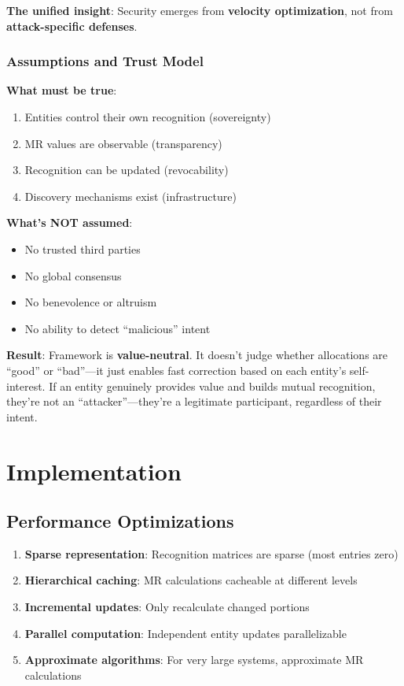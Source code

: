 \documentclass[11pt,a4paper]{article}
\theoremstyle{definition}
\theoremstyle{remark}
\begin{document}
\textbf{The unified insight}: Security emerges from \textbf{velocity optimization}, not from \textbf{attack-specific defenses}.

\subsubsection{Assumptions and Trust Model}

\textbf{What must be true}:
\begin{enumerate}
\item Entities control their own recognition (sovereignty)
\item MR values are observable (transparency)
\item Recognition can be updated (revocability)
\item Discovery mechanisms exist (infrastructure)
\end{enumerate}

\textbf{What's NOT assumed}:
\begin{itemize}
\item No trusted third parties
\item No global consensus
\item No benevolence or altruism
\item No ability to detect ``malicious'' intent
\end{itemize}

\textbf{Result}: Framework is \textbf{value-neutral}. It doesn't judge whether allocations are ``good'' or ``bad''---it just enables fast correction based on each entity's self-interest. If an entity genuinely provides value and builds mutual recognition, they're not an ``attacker''---they're a legitimate participant, regardless of their intent.

\section{Implementation}
\label{sec:implementation}

\subsection{Performance Optimizations}

\begin{enumerate}
\item \textbf{Sparse representation}: Recognition matrices are sparse (most entries zero)
\item \textbf{Hierarchical caching}: MR calculations cacheable at different levels
\item \textbf{Incremental updates}: Only recalculate changed portions
\item \textbf{Parallel computation}: Independent entity updates parallelizable
\item \textbf{Approximate algorithms}: For very large systems, approximate MR calculations
\end{enumerate}
\end{document}
